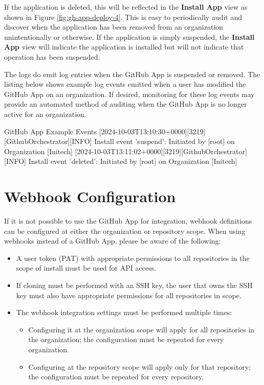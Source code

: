 If the \cxoneflow application is deleted, this will be reflected in the \textbf{Install App} view as shown in Figure \ref{fig:gh-app-deploy-4}.
This is easy to periodically audit and discover when the application has been removed from an organization unintentionally or otherwise.
If the application is simply suspended, the \textbf{Install App} view will indicate the application is installed but will not indicate
that operation has been suspended.

The \cxoneflow logs do emit log entries when the GitHub App is suspended or removed. The listing below shows example log events
emitted when a user has modified the GitHub App on an organization.  If desired, monitoring for these log events may provide
an automated method of auditing when the GitHub App is no longer active for an organization.

\begin{code}{GitHub App Example Events}{}{}
[2024-10-03T13:10:30+0000][3219][GithubOrchestrator][INFO] Install event 'suspend': Initiated by [root] on Organization [Initech]
[2024-10-03T13:11:02+0000][3219][GithubOrchestrator][INFO] Install event 'deleted': Initiated by [root] on Organization [Initech]
\end{code}

\section{Webhook Configuration}

If it is not possible to use the GitHub App for \cxoneflow integration, webhook definitions can be configured at either the
organization or repository scope.  When using webhooks instead of a GitHub App, please be aware of the following:

\begin{itemize}
    \item A user token (PAT) with appropriate permissions to all repositories in the scope of install must be used for API access.
    \item If cloning must be performed with an SSH key, the user that owns the SSH key must also have appropriate permissions for
    all repositories in scope.
    \item The webhook integration settings must be performed multiple times:
    \begin{itemize}
        \item Configuring it at the organization scope will apply for all repositories in the organization; the configuration must be repeated for
        every organization.
        \item Configuring at the repository scope will apply only for that repository; the configuration must be repeated for every
        repository.
    \end{itemize}
\end{itemize}

